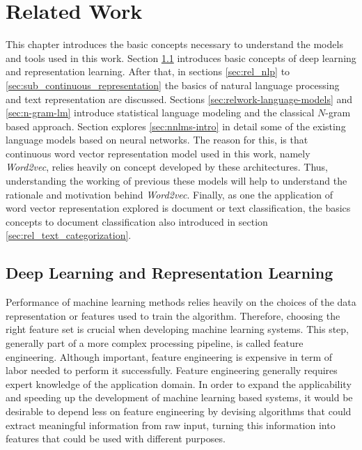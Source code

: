 
\chapter{Related Work}
\label{chap:related_work}

This chapter introduces the basic concepts necessary to understand the models
and tools  used in this work. Section \ref{sec:deep_learning} introduces
basic concepts of deep learning and representation learning. After that, in
sections  \ref{sec:rel_nlp} to \ref{sec:sub_continuous_representation}
the basics of natural language processing and text representation  are
discussed. Sections \ref{sec:relwork-language-models} and \ref{sec:n-gram-lm} introduce statistical
language modeling and the classical $N$-gram based approach. Section explores 
\ref{sec:nnlms-intro}  in detail some of the existing language  models based
on neural networks. The reason for this, is that continuous word vector
representation model used in this work, namely \textit{Word2vec}, relies
heavily on concept developed by these architectures. Thus, understanding the
working of previous these models  will help to understand the rationale and
motivation behind \textit{Word2vec}. Finally, as one the application of word
vector representation explored is document or text classification, the basics
concepts to document classification also introduced in section \ref{sec:rel_text_categorization}.

\section{Deep Learning and Representation Learning}
 \label{sec:deep_learning}
Performance of machine learning methods relies heavily on the choices of the
data representation or features used to train the algorithm. Therefore,
choosing the right feature set is crucial when developing  machine learning
 systems. This step, generally part of a more complex processing
pipeline, is called feature engineering.
Although important, feature engineering is expensive in term of labor needed
to perform it successfully. Feature engineering generally requires   expert
knowledge of the application domain.  In order to expand the applicability
and speeding up the development of machine learning based systems, it would
be desirable to 
depend less on feature engineering by devising algorithms  that could extract
meaningful  information from raw input, turning this information into
features that could be used with different purposes.

